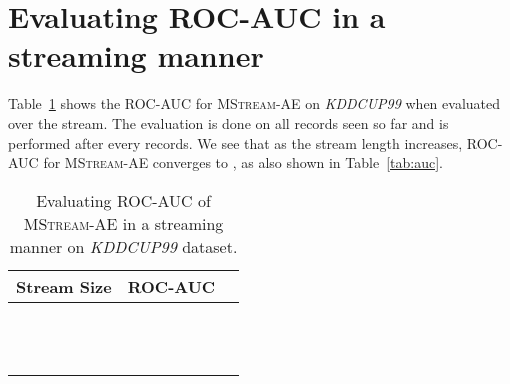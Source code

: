 \documentclass[sigconf]{acmart}
\newcommand{\method}{\textsc{MStream}}
\begin{document}
\section{Evaluating ROC-AUC in a streaming manner}
\label{app:4}
Table~\ref{tab:streamingauc} shows the ROC-AUC for \method-AE on \emph{KDDCUP99} when evaluated over the stream. The evaluation is done on all records seen so far and is performed after every  records. We see that as the stream length increases, ROC-AUC for \method-AE converges to , as also shown in Table~\ref{tab:auc}.



\begin{table}[H]
\centering
\caption{Evaluating ROC-AUC of \method-AE in a streaming manner on \emph{KDDCUP99} dataset.}
\label{tab:streamingauc}
\begin{tabular}{@{}rcc@{}}
\toprule
	Stream Size & ROC-AUC \\ \midrule
  &  \\
         &  \\
         &  \\
         &  \\
         &  \\
         &  \\
         &  \\
         &  \\
         &  \\
         &  \\
         &  \\
         &  \\
\bottomrule
\end{tabular}
\end{table}
\end{document}
